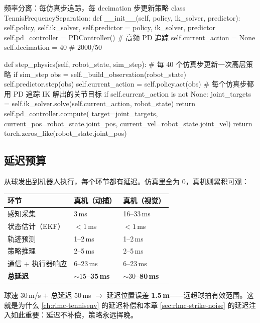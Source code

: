 \begin{codebox}[Python]{频率分离：每仿真步追踪，每 decimation 步更新策略}
class TennisFrequencySeparation:
    def __init__(self, policy, ik_solver, predictor):
        self.policy, self.ik_solver, self.predictor = policy, ik_solver, predictor
        self.pd_controller = PDController()       # 高频 PD 追踪
        self.current_action = None
        self.decimation = 40                      # 2000/50

    def step_physics(self, robot_state, sim_step):
        # 每 40 个仿真步更新一次高层策略
        if sim_step %
            obs = self._build_observation(robot_state)
            self.predictor.step(obs)
            self.current_action = self.policy.act(obs)
        # 每个仿真步都用 PD 追踪 IK 解出的关节目标
        if self.current_action is not None:
            joint_targets = self.ik_solver.solve(self.current_action, robot_state)
            return self.pd_controller.compute(
                target=joint_targets,
                current_pos=robot_state.joint_pos,
                current_vel=robot_state.joint_vel)
        return torch.zeros_like(robot_state.joint_pos)
\end{codebox}

\subsection{延迟预算}

从球发出到机器人执行，每个环节都有延迟。仿真里全为 0，真机则累积可观：

\begin{center}
\small
\begin{tabular}{@{}lll@{}}
\toprule
环节 & 真机（动捕） & 真机（视觉） \\
\midrule
感知采集 & 3\,ms & 16--33\,ms \\
状态估计（EKF） & $<1$\,ms & $<1$\,ms \\
轨迹预测 & 1--2\,ms & 1--2\,ms \\
策略推理 & 2--5\,ms & 2--5\,ms \\
通信 + 执行器响应 & 6--23\,ms & 6--23\,ms \\
\textbf{总延迟} & \textbf{$\sim 15$--35\,ms} & \textbf{$\sim 30$--80\,ms} \\
\bottomrule
\end{tabular}
\end{center}

球速 30\,m/s $+$ 总延迟 50\,ms $\to$ 延迟位置误差 \textbf{1.5\,m}——远超球拍有效范围。这就是为什么 \cref{ch:rlmc-tennisenv} 的延迟补偿和本章 \cref{sec:rlmc-strike-noise} 的延迟注入如此重要：延迟不补偿，策略永远挥晚。

